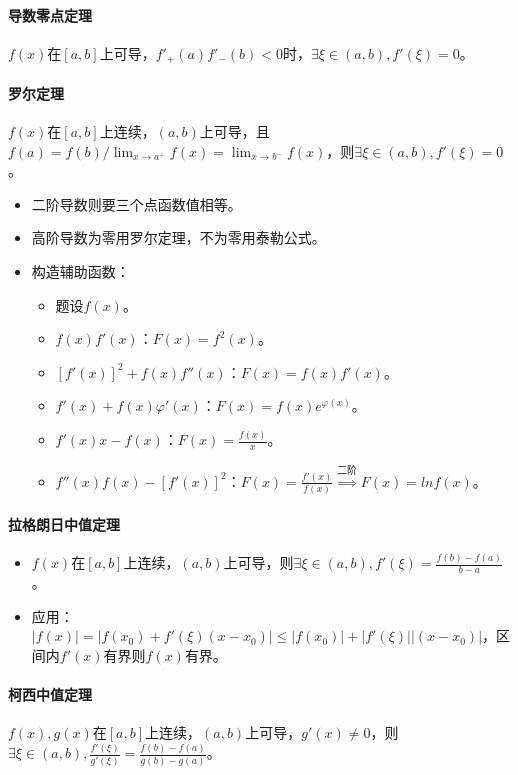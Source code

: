 \documentclass[
12pt, %
a4paper, 
oneside, %
headinclude,footinclude, %
]{scrartcl}
\begin{document}
\paragraph{导数零点定理}
$ f(x) $在$ [a, b] $上可导，$ f'_+(a)f'_-(b) < 0 $时，$ \exists \xi \in (a, b), f'(\xi) = 0 $。
\paragraph{罗尔定理}
$ f(x) $在$ [a, b] $上连续，$ (a, b) $上可导，且$ f(a) = f(b) / \lim_{x \to a^+} f(x) = \lim_{x \to b^-} f(x) $，则$ \exists \xi \in (a, b), f'(\xi) = 0 $。
\begin{itemize}
\item 二阶导数则要三个点函数值相等。
\item 高阶导数为零用罗尔定理，不为零用泰勒公式。
\item 构造辅助函数：
\begin{itemize}
\item 题设$ f(x) $。
\item $ f(x)f'(x) $：$ F(x) = f^2(x) $。
\item $ [f'(x)]^2 + f(x)f''(x) $：$ F(x) = f(x)f'(x) $。
\item $ f'(x) + f(x)\varphi'(x) $：$ F(x) = f(x)e^{\varphi(x)} $。
\item $ f'(x)x - f(x) $：$ F(x) = \frac{f(x)}{x} $。
\item $ f''(x)f(x) - [f'(x)]^2 $：$ F(x) = \frac{f'(x)}{f(x)} $$ \overset{\text{二阶}}{\Longrightarrow} $$ F(x) = ln f(x) $。
\end{itemize}
\end{itemize}
\paragraph{拉格朗日中值定理}
\begin{itemize}
\item $ f(x) $在$ [a, b] $上连续，$ (a, b) $上可导，则$ \exists \xi \in (a, b), f'(\xi) = \frac{f(b) - f(a)}{b - a} $。
\item 应用：$ |f(x)| = |f(x_0) + f'(\xi)(x - x_0)| \leq |f(x_0)| + |f'(\xi)||(x - x_0)| $，区间内$ f'(x) $有界则$ f(x) $有界。
\end{itemize}
\paragraph{柯西中值定理}
$ f(x),g(x) $在$ [a, b] $上连续，$ (a, b) $上可导，$ g'(x) \neq 0 $，则$ \exists \xi \in (a, b), \frac{f'(\xi)}{g'(\xi)} = \frac{f(b) - f(a)}{g(b) - g(a)} $。
\end{document}
